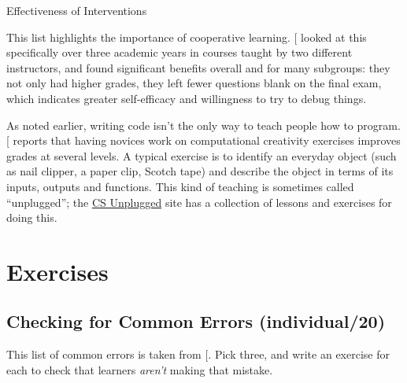Effectiveness of Interventions

This list highlights the importance of cooperative learning.
{[}\protect[\hyperlink{b:Beck2013}{Beck2013}]{]} looked at this specifically over three academic years
in courses taught by two different instructors, and found significant
benefits overall and for many subgroups: they not only had higher
grades, they left fewer questions blank on the final exam, which
indicates greater self-efficacy and willingness to try to debug things.

As noted earlier, writing code isn't the only way to teach people how
to program. {[}\protect[\hyperlink{b:Shel2017}{Shel2017}]{]} reports that having novices work on
computational creativity exercises improves grades at several
levels. A typical exercise is to identify an everyday object (such as
nail clipper, a paper clip, Scotch tape) and describe the object in
terms of its inputs, outputs and functions. This kind of teaching is
sometimes called ``unplugged''; the \href{https://csunplugged.org/en/}{CS Unplugged} site
has a collection of lessons and exercises for doing this.

\section{Exercises}\label{s:pck-exercises}

\subsection{Checking for Common Errors (individual/20)}\label{checking-for-common-errors-individual20}

This list of common errors is taken from {[}\protect[\hyperlink{b:Sirk2012}{Sirk2012}]{]}. Pick three,
and write an exercise for each to check that learners \emph{aren't} making
that mistake.

